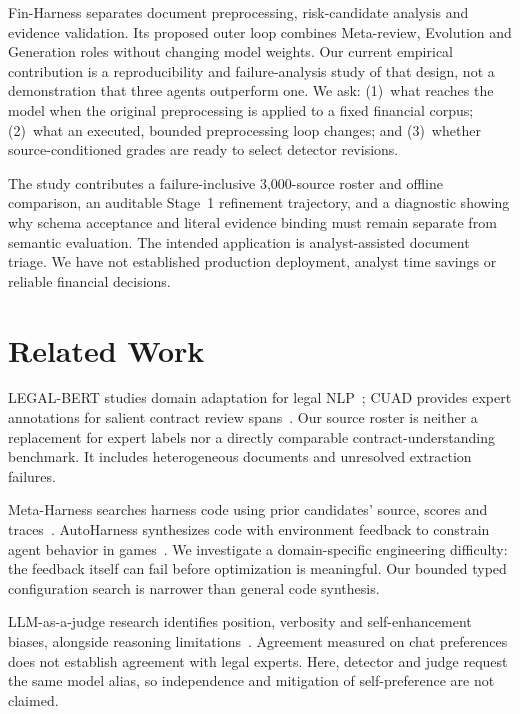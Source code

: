 \documentclass[11pt]{article}
\begin{document}
Fin-Harness separates document preprocessing, risk-candidate analysis and
evidence validation. Its proposed outer loop combines Meta-review,
Evolution and Generation roles without changing model weights. Our current
empirical contribution is a reproducibility and failure-analysis study of
that design, not a demonstration that three agents outperform one.
We ask: (1)~what reaches the model when the original preprocessing is
applied to a fixed financial corpus; (2)~what an executed, bounded
preprocessing loop changes; and (3)~whether source-conditioned grades are
ready to select detector revisions.

The study contributes a failure-inclusive 3,000-source roster and offline
comparison, an auditable Stage~1 refinement trajectory, and a diagnostic
showing why schema acceptance and literal evidence binding must remain
separate from semantic evaluation. The intended application is
analyst-assisted document triage. We have not established production
deployment, analyst time savings or reliable financial decisions.

\section{Related Work}
LEGAL-BERT studies domain adaptation for legal NLP~\citep{chalkidis-etal-2020-legalbert};
CUAD provides expert annotations for salient contract review
spans~\citep{cuad}. Our source roster is neither a replacement for expert
labels nor a directly comparable contract-understanding benchmark.
It includes heterogeneous documents and unresolved extraction failures.

Meta-Harness searches harness code using prior candidates' source, scores
and traces~\citep{lee2026metaharness}. AutoHarness synthesizes code with
environment feedback to constrain agent behavior in
games~\citep{lou2026autoharnessimprovingllmagentsimprovingllmagents}.
We investigate a domain-specific engineering difficulty: the feedback
itself can fail before optimization is meaningful. Our bounded typed
configuration search is narrower than general code synthesis.

LLM-as-a-judge research identifies position, verbosity and self-enhancement
biases, alongside reasoning limitations~\citep{zheng2023judge}.
Agreement measured on chat preferences does not establish agreement with
legal experts. Here, detector and judge request the same model alias,
so independence and mitigation of self-preference are not claimed.
\end{document}
